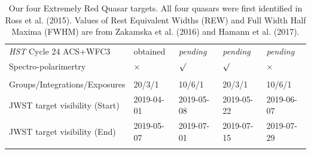 \begin{table}[h]
\begin{center}
\begin{tabular}{||  l|l|l|l|l ||}
  {\it HST} Cycle 24  ACS+WFC3  %
                                       & obtained  &  {\it pending}   &{\it pending}  & {\it pending} \\
  Spectro-polarimertry       &   $\times$            &  $\surd$                &  $\surd$           & $\times$  \\
 &&&& \\
Groups/Integrations/Exposures      &  20/3/1              &   10/6/1  &   20/3/1         &   10/6/1         \\
JWST target visibility (Start) & 2019-04-01    & 2019-05-08    & 2019-05-22   & 2019-06-07  \\ 
JWST target visibility (End)  & 2019-05-07    & 2019-07-01     & 2019-07-15   & 2019-07-29   \\ 
 &&&& \\
\hline\hline
      \end{tabular}
\caption{
Our four Extremely Red Quasar targets. All four quasars were first
identified in Ross et al. (2015).  Values of Rest Equivalent Widths
(REW) and Full Width Half Maxima (FWHM) are from Zakamska et
al. (2016) and Hamann et al. (2017).
}
\label{tab:targets} 
  \end{center}
\end{table}

